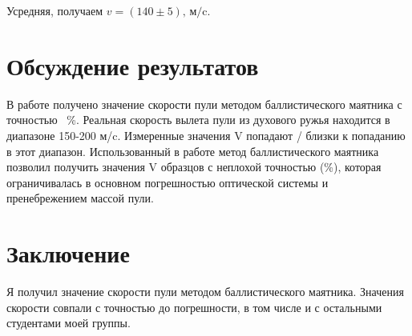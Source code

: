 \documentclass[
	a4paper, %
	12pt, %
]{article}
\begin{document}
	Усредняя, получаем $v=(140\pm5)\text{, м/c}$.
	\section{Обсуждение результатов}
	В работе получено значение скорости пули методом баллистического маятника с точностью ~{}\%. Реальная скорость вылета пули из духового ружья находится в диапазоне 150-200 м/c. Измеренные значения V попадают / близки к попаданию в этот диапазон.
	Использованный в работе метод баллистического маятника позволил получить значения V образцов с неплохой точностью ({}\%), которая ограничивалась в основном погрешностью оптической системы и пренебрежением массой пули.
	\section{Заключение}
	Я получил значение скорости пули методом баллистического маятника. Значения скорости совпали с точностью до погрешности, в том числе и с остальными студентами моей группы.
	
	
\end{document}

